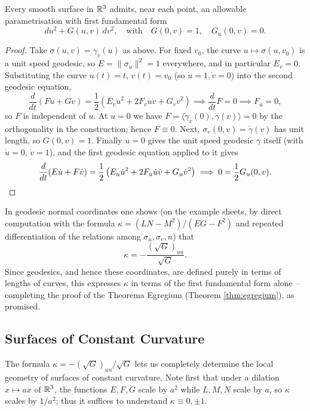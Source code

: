 \documentclass[a4paper]{scrartcl}
\begin{document}
\begin{corollary}\label{cor:geodesicnormalcoords}
    Every smooth surface in $\mathbb{R}^3$ admits, near each point, an allowable parametrisation with first fundamental form
    $$
    du^2 + G(u, v)\, dv^2, \quad \text{with} \quad G(0, v) = 1, \quad G_u(0, v) = 0.
    $$
\end{corollary}
\begin{proof}
    Take $\sigma(u, v) = \gamma_v(u)$ as above. For fixed $v_0$, the curve $u \mapsto \sigma(u, v_0)$ is a unit speed geodesic, so $E = \|\sigma_u\|^2 = 1$ everywhere, and in particular $E_v = 0$. Substituting the curve $u(t) = t$, $v(t) = v_0$ (so $\dot u = 1, \dot v = 0$) into the second geodesic equation,
    $$
    \frac{d}{dt}\left(F \dot u + G \dot v\right) = \frac{1}{2}\left(E_v \dot u^2 + 2 F_v \dot u \dot v + G_v \dot v^2\right) \implies \frac{d}{dt} F = 0 \implies F_u = 0,
    $$
    so $F$ is independent of $u$. At $u = 0$ we have $F = \langle \dot\gamma_v(0), \dot\gamma(v)\rangle = 0$ by the orthogonality in the construction; hence $F \equiv 0$. Next, $\sigma_v(0, v) = \dot\gamma(v)$ has unit length, so $G(0, v) = 1$. Finally $u = 0$ gives the unit speed geodesic $\gamma$ itself (with $\dot u = 0$, $\dot v = 1$), and the first geodesic equation applied to it gives
    $$
    \frac{d}{dt}(E \dot u + F \dot v) = \frac{1}{2}\left(E_u \dot u^2 + 2F_u \dot u \dot v + G_u \dot v^2\right) \implies 0 = \frac{1}{2}G_u(0, v). \qedhere
    $$
\end{proof}

In geodesic normal coordinates one shows (on the example sheets, by direct computation with the formula $\kappa = (LN - M^2)/(EG - F^2)$ and repeated differentiation of the relations among $\sigma_u, \sigma_v, n$) that
$$
\kappa = -\frac{\left(\sqrt{G}\right)_{uu}}{\sqrt{G}}.
$$
Since geodesics, and hence these coordinates, are defined purely in terms of lengths of curves, this expresses $\kappa$ in terms of the first fundamental form alone -- completing the proof of the Theorema Egregium (Theorem \ref{thm:egregium}), as promised.

\subsection{Surfaces of Constant Curvature}

The formula $\kappa = -(\sqrt{G})_{uu}/\sqrt{G}$ lets us completely determine the local geometry of surfaces of constant curvature. Note first that under a dilation $x \mapsto ax$ of $\mathbb{R}^3$, the functions $E, F, G$ scale by $a^2$ while $L, M, N$ scale by $a$, so $\kappa$ scales by $1/a^2$; thus it suffices to understand $\kappa \equiv 0, \pm 1$.
\end{document}
